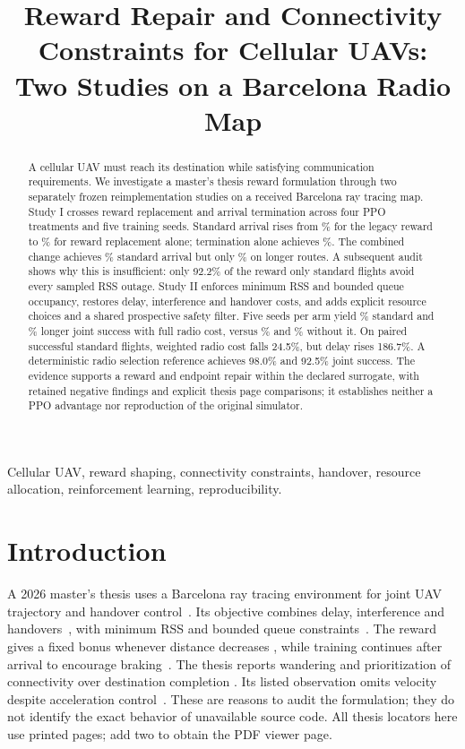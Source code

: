 \documentclass[conference]{IEEEtran}
\title{Reward Repair and Connectivity Constraints for Cellular UAVs:\\Two Studies on a Barcelona Radio Map}
\author{\IEEEauthorblockN{Guillem Moreno Garcia and Evgenii Vinogradov}
\IEEEauthorblockA{Universitat Polit\`ecnica de Catalunya, Barcelona, Spain\\Research draft, 12 September 2026}}
\begin{document}
\maketitle
\begin{abstract}
A cellular UAV must reach its destination while satisfying communication
requirements. We investigate a master's thesis reward formulation through two
separately frozen reimplementation studies on a received Barcelona ray tracing
map. Study I crosses reward replacement and arrival termination across four
PPO treatments and five training seeds. Standard arrival rises from
\LegacySuccess\% for the legacy reward to \RewardOnlySuccess\% for reward
replacement alone; termination alone achieves \TerminationSuccess\%.
The combined change achieves \FixedSuccess\% standard arrival but only
\FixedLongSuccess\% on longer routes. A subsequent audit shows why this is
insufficient: only 92.2\% of the reward only standard flights avoid every
sampled RSS outage. Study II enforces minimum RSS and bounded queue occupancy,
restores delay, interference and handover costs, and adds explicit resource
choices and a shared prospective safety filter. Five seeds per arm yield
\FullStd\% standard and \FullLong\% longer joint success with full radio cost,
versus \ArrivalStd\% and \ArrivalLong\% without it. On paired successful
standard flights, weighted radio cost falls 24.5\%, but delay rises 186.7\%.
A deterministic radio selection reference achieves 98.0\% and 92.5\% joint
success. The evidence supports a reward and endpoint repair within the declared
surrogate, with retained negative findings and explicit thesis page comparisons;
it establishes neither a PPO advantage nor reproduction of the original simulator.
\end{abstract}
\begin{IEEEkeywords}
Cellular UAV, reward shaping, connectivity constraints, handover, resource
allocation, reinforcement learning, reproducibility.
\end{IEEEkeywords}

\section{Introduction}
A 2026 master's thesis uses a Barcelona ray tracing environment for joint UAV
trajectory and handover control~\cite[pp.~6--7, Sec.~3.1]{thesis}. Its objective
combines delay, interference and handovers~\cite[p.~10, Eq.~(11)]{thesis}, with
minimum RSS and bounded queue constraints~\cite[p.~11, Eq.~(12), C2 and C4]{thesis}.
The reward gives a fixed bonus whenever distance decreases
\cite[p.~12, Eqs.~(13)--(14); p.~15, Table~3]{thesis}, while training continues
after arrival to encourage braking~\cite[p.~12, Sec.~5.2]{thesis}. The thesis
reports wandering and prioritization of connectivity over destination completion
\cite[p.~19, Sec.~7.2; p.~21, Sec.~8]{thesis}. Its listed observation omits
velocity despite acceleration control~\cite[p.~12, Sec.~5.2; p.~9, Eq.~(2)]{thesis}.
These are reasons to audit the formulation; they do not identify the exact
behavior of unavailable source code. All thesis locators here use printed
pages; add two to obtain the PDF viewer page.
\end{document}
